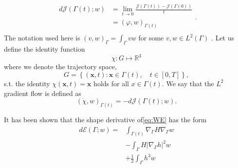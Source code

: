 \begin{equation*}
    \begin{split}
d\mathcal{J} \left( \Gamma \left( t \right) ; w  \right)  & = \lim_{t \to 0} \frac{\mathcal{J}\left( \Gamma \left( t \right)  \right) - \mathcal{J} (  \Gamma \left( 0 \right))}{t} \\
&= \left(  \varphi ,w\right)_{\Gamma \left( t \right) }  \\
    \end{split}
.\end{equation*}
The notation used here is $\left( v,w \right)_{\Gamma } = \int_{\Gamma }^{}  vw   $ for some $ v,w \in L^{2}\left( \Gamma \right) $ .
Let us define the identity function $$\chi: G \mapsto  \mathbb{R} ^{3}$$ where we denote the trajectory space,
$$G = \left\{ \left( \mathbf{x},t \right) : \mathbf{x} \in \Gamma \left( t \right), \quad t \in \left[ 0,T \right]   \right\},  $$
s.t. the
identity $\chi \left( \mathbf{x},t \right)
= \mathbf{x} $ holds for all $  x \in \Gamma \left( t \right) $. We say that the $L^{2}$  gradient flow is defined as
\[
\left( \dot{\chi } , w \right)_{\Gamma \left( t \right)  } = -d\mathcal{J}\left( \Gamma \left( t \right); w  \right).
\]

It has been shown that the shape derivative of\eqref{eq:WE} has the form \cite{willmore1996riemannian}
\[
    \begin{split}
        d\mathcal{E} \left( \Gamma; w  \right)  =& \int_{\Gamma \left( t \right) }^{}  \nabla_{\Gamma } H  \nabla _{\Gamma } w    \\
    & - \int_{\Gamma }^{} H  |\nabla _{\Gamma }  h |^{2} w   \\
    &  + \frac{1}{2} \int_{\Gamma }^{} h^{3} w
    \end{split}
\]












